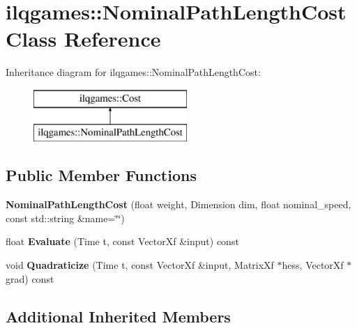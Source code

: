 \hypertarget{classilqgames_1_1_nominal_path_length_cost}{}\section{ilqgames\+:\+:Nominal\+Path\+Length\+Cost Class Reference}
\label{classilqgames_1_1_nominal_path_length_cost}
Inheritance diagram for ilqgames\+:\+:Nominal\+Path\+Length\+Cost\+:\begin{figure}[H]
\begin{center}
\leavevmode
\includegraphics[height=2.000000cm]{classilqgames_1_1_nominal_path_length_cost}
\end{center}
\end{figure}
\subsection*{Public Member Functions}
\begin{DoxyCompactItemize}
\item 
{\bfseries Nominal\+Path\+Length\+Cost} (float weight, Dimension dim, float nominal\+\_\+speed, const std\+::string \&name=\char`\"{}\char`\"{})\hypertarget{classilqgames_1_1_nominal_path_length_cost_a2dbd457c7e1b6c202d7c5f3b72bcecde}{}\label{classilqgames_1_1_nominal_path_length_cost_a2dbd457c7e1b6c202d7c5f3b72bcecde}

\item 
float {\bfseries Evaluate} (Time t, const Vector\+Xf \&input) const \hypertarget{classilqgames_1_1_nominal_path_length_cost_a3a8ac79f9c35f39328a0a7829881386f}{}\label{classilqgames_1_1_nominal_path_length_cost_a3a8ac79f9c35f39328a0a7829881386f}

\item 
void {\bfseries Quadraticize} (Time t, const Vector\+Xf \&input, Matrix\+Xf $\ast$hess, Vector\+Xf $\ast$grad) const \hypertarget{classilqgames_1_1_nominal_path_length_cost_a91f8dbf5342e12dea4ff405ac65a3184}{}\label{classilqgames_1_1_nominal_path_length_cost_a91f8dbf5342e12dea4ff405ac65a3184}

\end{DoxyCompactItemize}
\subsection*{Additional Inherited Members}



